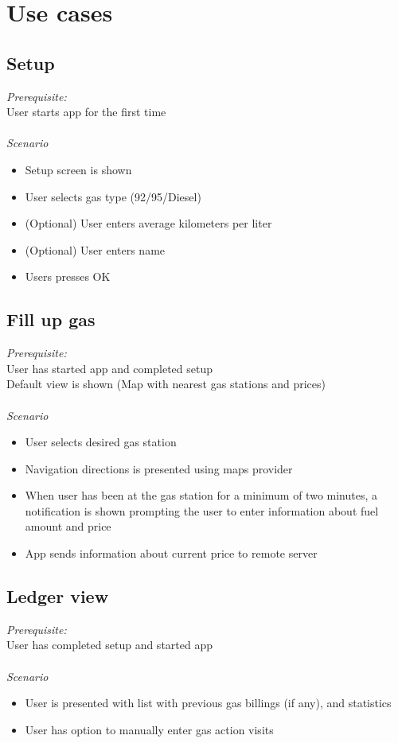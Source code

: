 
\chapter{Use cases}

\section{Setup}
\emph{Prerequisite:}\\
User starts app for the first time\\
\\
\emph{Scenario}
\begin{itemize}
\item Setup screen is shown
\item User selects gas type (92/95/Diesel)
\item (Optional) User enters average kilometers per liter
\item (Optional) User enters name
\item Users presses OK
\end{itemize}

\section{Fill up gas}
\emph{Prerequisite:}\\
User has started app and completed setup\\
Default view is shown (Map with nearest gas stations and prices)\\
\\
\emph{Scenario}
\begin{itemize}
	\item User selects desired gas station
\item Navigation  directions is presented using maps provider
\item When user has been at the gas station for a minimum of two minutes, a notification is shown prompting the user to enter information about fuel amount and price
\item App sends information about current price to remote server
\end{itemize}

\section{Ledger view}
\emph{Prerequisite:}\\
User has completed setup and started app\\
\\
\emph{Scenario}
\begin{itemize}
	\item User is presented with list with previous gas billings (if any), and statistics
	\item User has option to manually enter gas action visits
\end{itemize}

